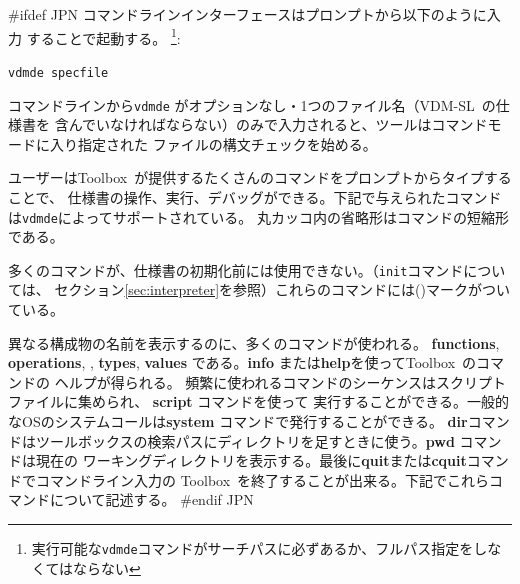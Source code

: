 \documentclass[\pformat,12pt]{article}
\newcommand{\vdmslpp}{VDM-SL}
\newcommand{\Toolbox}{Toolbox}
\newcommand{\vdmde}{vdmde}
\newcommand{\vdmslpp}{VDM++}
\newcommand{\Toolbox}{Toolbox}
\newcommand{\vdmde}{vppde}
\newcommand{\cmd}{\tt }
\begin{document}
#ifdef JPN
コマンドラインインターフェースはプロンプトから以下のように入力 することで起動する。
\footnote{実行可能な{\tt \vdmde}コマンドがサーチパスに必ずあるか、フルパス指定をしなくてはならない}:

{\tt \vdmde\ specfile}

コマンドラインから{\tt \vdmde} がオプションなし・1つのファイル名（\vdmslpp\ の仕様書を
含んでいなければならない）のみで入力されると、ツールはコマンドモードに入り指定された
ファイルの構文チェックを始める。

ユーザーは\Toolbox\ が提供するたくさんのコマンドをプロンプトからタイプすることで、
仕様書の操作、実行、デバッグができる。下記で与えられたコマンドは{\tt \vdmde}によってサポートされている。
丸カッコ内の省略形はコマンドの短縮形である。

多くのコマンドが、仕様書の初期化前には使用できない。（{\cmd init}コマンドについては、
セクション\ref{sec:interpreter}を参照）これらのコマンドには({\tt *})マークがついている。

異なる構成物の名前を表示するのに、多くのコマンドが使われる。
\textbf{functions}, \textbf{operations}, 
,
\textbf{types}, \textbf{values}
である。\textbf{info} または\textbf{help}を使って\Toolbox\ のコマンドの
ヘルプが得られる。
頻繁に使われるコマンドのシーケンスはスクリプトファイルに集められ、 \textbf{script} コマンドを使って
実行することができる。一般的なOSのシステムコールは\textbf{system} コマンドで発行することができる。
\textbf{dir}コマンドはツールボックスの検索パスにディレクトリを足すときに使う。\textbf{pwd} コマンドは現在の
ワーキングディレクトリを表示する。最後に\textbf{quit}または\textbf{cquit}コマンドでコマンドライン入力の
\Toolbox\ を終了することが出来る。下記でこれらコマンドについて記述する。
#endif JPN
\end{document}
